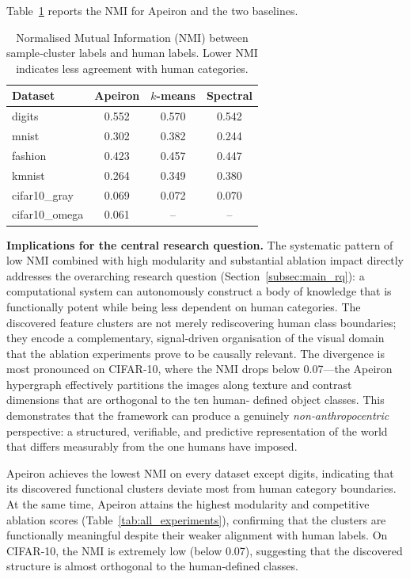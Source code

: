 Table~\ref{tab:nmi_pilot} reports the NMI for Apeiron and the two baselines.

\begin{table}[htbp]
\centering
\caption{Normalised Mutual Information (NMI) between sample‑cluster labels and human labels.  Lower NMI indicates less agreement with human categories.}
\label{tab:nmi_pilot}
\begin{tabular}{l c c c}
\toprule
\textbf{Dataset} & \textbf{Apeiron} & \textbf{\(k\)-means} & \textbf{Spectral} \\
\midrule
digits         & 0.552 & 0.570 & 0.542 \\
mnist          & 0.302 & 0.382 & 0.244 \\
fashion        & 0.423 & 0.457 & 0.447 \\
kmnist         & 0.264 & 0.349 & 0.380 \\
cifar10\_gray  & 0.069 & 0.072 & 0.070 \\
cifar10\_omega & 0.061 & – & – \\
\bottomrule
\end{tabular}
\end{table}
\noindent\textbf{Implications for the central research question.}
The systematic pattern of low NMI combined with high modularity and
substantial ablation impact directly addresses the overarching research
question (Section~\ref{subsec:main_rq}): a computational system can
autonomously construct a body of knowledge that is functionally potent
while being less dependent on human categories.  The discovered feature
clusters are not merely rediscovering human class boundaries; they
encode a complementary, signal‑driven organisation of the visual domain
that the ablation experiments prove to be causally relevant.  The
divergence is most pronounced on CIFAR‑10, where the NMI drops below
0.07—the Apeiron hypergraph effectively partitions the images along
texture and contrast dimensions that are orthogonal to the ten human‑
defined object classes.  This demonstrates that the framework can
produce a genuinely \emph{non‑anthropocentric} perspective: a structured,
verifiable, and predictive representation of the world that differs
measurably from the one humans have imposed.

Apeiron achieves the lowest NMI on every dataset except digits,
indicating that its discovered functional clusters deviate most from
human category boundaries.
At the same time, Apeiron attains the highest modularity and
competitive ablation scores (Table~\ref{tab:all_experiments}),
confirming that the clusters are functionally meaningful despite their
weaker alignment with human labels.
On CIFAR‑10, the NMI is extremely low (below 0.07), suggesting that
the discovered structure is almost orthogonal to the human‑defined
classes.

